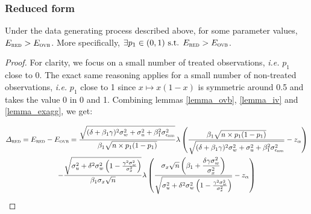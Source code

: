 \documentclass[a4paper, 11pt]{report}
\begin{document}
			\subsubsection{Reduced form}
			
            				\begin{proposition}
            					Under the data generating process described above, for some parameter values, $E_{\textsc{red}} > E_{\textsc{ovb}}$. More specifically, $\exists p_{1} \in (0, 1) \text{ s.t. } E_{\textsc{red}} > E_{\textsc{ovb}}$.
            				\end{proposition}
            				
            				\begin{proof}
				
					For clarity, we focus on a small number of treated observations, \textit{i.e.} $p_{1}$ close to 0. The exact same reasoning applies for a small number of non-treated observations, \textit{i.e.} $p_{1}$ close to 1 since $x \mapsto x(1-x)$ is symmetric around 0.5 and takes the value 0 in 0 and 1. Combining lemmas \ref{lemma_ovb}, \ref{lemma_iv} and \ref{lemma_exagg}, we get:
            				
                                		\begin{multline*}
                                			\varDelta_{\textsc{red}} = E_{\textsc{red}} - E_{\textsc{ovb}} = 
                                				\dfrac{\sqrt{(\delta + \beta_{1}\gamma)^{2} \sigma_{w}^{2} + \sigma_{u}^{2} + \beta_{1}^{2} \sigma_{\epsilon_{\textsc{red}}}^{2}}}{\beta_{1}\sqrt{n \times p_{1}(1-p_{1})}}
					 \lambda \left( \dfrac{\beta_{1}\sqrt{n \times p_{1}(1-p_{1})}}{\sqrt{(\delta + \beta_{1}\gamma)^{2} \sigma_{w}^{2} + \sigma_{u}^{2} + \beta_{1}^{2} \sigma_{\epsilon_{\textsc{red}}}^{2}}} - z_{\alpha} \right)\\
                                				- \dfrac{\sqrt{ \sigma_{u}^{2} +  \delta^{2} \sigma_{w}^{2} \left(1 - \frac{\gamma^{2}\sigma_{w}^{2}}{\sigma_{x}^{2}} \right)}}{\beta_{1} \sigma_{x} \sqrt{n}}
                                				 \lambda \left( \dfrac{ \sigma_{x}\sqrt{n} \left( \beta_{1} + \dfrac{\delta \gamma \sigma_{w}^{2}}{\sigma_{x}^{2}} \right)  }{\sqrt{\sigma_{u}^{2} +  \delta^{2} \sigma_{w}^{2} \left(1 - \frac{\gamma^{2}\sigma_{w}^{2}}{\sigma_{x}^{2}} \right)}} - z_{\alpha} \right)
                                		\end{multline*}
            		                    				

\end{proof}
\end{document}
